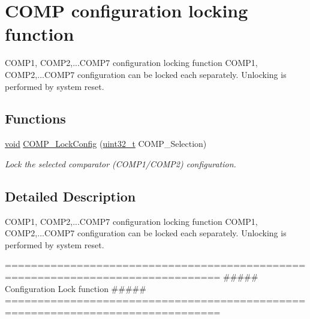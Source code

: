 \hypertarget{group___c_o_m_p___group3}{\section{C\-O\-M\-P configuration locking function}
\label{group___c_o_m_p___group3}
}


C\-O\-M\-P1, C\-O\-M\-P2,...C\-O\-M\-P7 configuration locking function C\-O\-M\-P1, C\-O\-M\-P2,...C\-O\-M\-P7 configuration can be locked each separately. Unlocking is performed by system reset.  


\subsection*{Functions}
\begin{DoxyCompactItemize}
\item 
\hyperlink{group___n_a_m_e_ga18028b8badbf1ea7e704ccac3c488e82}{void} \hyperlink{group___c_o_m_p___group3_gaf39e2e4846c961ba337b472518bd0083}{C\-O\-M\-P\-\_\-\-Lock\-Config} (\hyperlink{stdint_8h_a435d1572bf3f880d55459d9805097f62}{uint32\-\_\-t} C\-O\-M\-P\-\_\-\-Selection)
\begin{DoxyCompactList}\small\item\em Lock the selected comparator (C\-O\-M\-P1/\-C\-O\-M\-P2) configuration. \end{DoxyCompactList}\end{DoxyCompactItemize}


\subsection{Detailed Description}
C\-O\-M\-P1, C\-O\-M\-P2,...C\-O\-M\-P7 configuration locking function C\-O\-M\-P1, C\-O\-M\-P2,...C\-O\-M\-P7 configuration can be locked each separately. Unlocking is performed by system reset. \begin{DoxyVerb} ===============================================================================
                   ##### Configuration Lock function #####
 ===============================================================================  \end{DoxyVerb}
 


